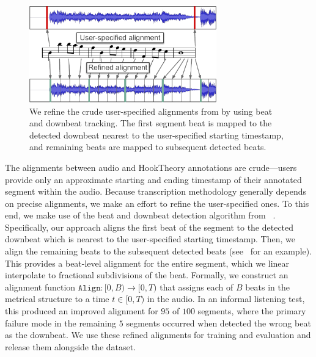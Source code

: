 \begin{figure}
    \centering
    \includegraphics[width=8.1cm]{figs/alignment.pdf}
    \caption{We refine the crude user-specified alignments from \hooktheory{} by using beat and downbeat tracking. The first segment beat is mapped to the detected downbeat nearest to the user-specified starting timestamp, and remaining beats are mapped to subsequent detected beats.}
 \label{fig:alignment}
 \vspace{-5mm}
\end{figure}

The alignments between audio and HookTheory annotations are crude---users provide only an approximate starting and ending timestamp of their annotated segment within the audio. 
Because transcription methodology generally depends on precise alignments, we make an effort to refine the user-specified ones. 
To this end, we make use of the beat and downbeat detection algorithm from \madmom{}~\cite{bock2016joint,bock2016madmom}. 
Specifically, our approach aligns the first beat of the segment to the detected downbeat which is nearest to the user-specified starting timestamp. 
Then, we align the remaining beats to the subsequent detected beats (see~ for an example). 
This provides a beat-level alignment for the entire segment, which we linear interpolate to fractional subdivisions of the beat. 
Formally, we construct an alignment function $\texttt{Align} : [0,B) \to [0,T)$ that assigns each of $B$ beats in the metrical structure to a time $t \in [0,T)$ in the audio.
In an informal listening test, this produced an improved alignment for $95$ of $100$ segments, 
where the primary failure mode in the remaining $5$ segments occurred when \madmom{} detected the wrong beat as the downbeat. 
We use these refined alignments for training and evaluation and release them alongside the dataset.

\subsection{\Beatpooling}
\label{sec:beatpool}

